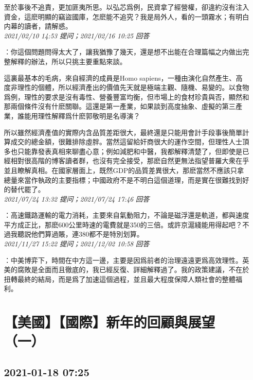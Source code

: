 \documentclass[twocolumn]{ctexart}
\begin{document}
至於事後不追責，更加匪夷所思。以弘芯爲例，民資拿了經營權，卻違約沒有注入資金，這麽明顯的竊盜國庫，怎麽能不追究？我是局外人，看的一頭霧水；有明白内幕的讀者，請解惑。
\\

\textit{\hfill\noindent\small 2021/02/10 14:53 提问；2021/02/16 10:25 回答}

：你這個問題問得太大了，讓我猶豫了幾天，還是想不出能在合理篇幅之内做出完整解釋的辦法，所以只挑主要重點來談。

這裏最基本的毛病，來自經濟的成員是Homo sapiens，一種由演化自然產生、高度非理性的個體，所以經濟產出的價值先天就是極端主觀、隨機、易變的。以食物爲例，理性的要求是沒有毒性、營養豐富均衡，但市場上的食材珍貴與否，顯然和那兩個條件沒有什麽關聯。這還是第一產業，如果談到高度抽象、虛擬的第三產業，誰能用理性解釋爲什麽郭敬明是名導演？

所以雖然經濟產值的實際内含品質差距很大，最終還是只能用會計手段事後簡單計算成交的總金額，很難排除虛胖。當然這留給奸商很大的運作空間，但理性人士頂多也只能靠發表真相來聊盡心意；例如減肥和中醫，我都解釋清楚了，但即使是已經相對很高階的博客讀者群，也沒有完全接受，那麽自然更無法指望普羅大衆在乎並且瞭解真相。在國家層面上，既然GDP的品質差異很大，那麽當然不應該只拿總量來當作執政的主要指標；中國政府不是不明白這個道理，而是實在很難找到好的替代罷了。
\\

\textit{\hfill\noindent\small 2021/07/24 13:32 提问；2021/07/24 17:46 回答}

：高速鐵路運輸的電力消耗，主要來自氣動阻力，不論是磁浮還是軌道，都與速度平方成正比，那麽600公里時速的電費就是350的三倍。或許京滬綫能用得起吧？不過我聽説他們算過賬，連380都不是特別划算。
\\

\textit{\hfill\noindent\small 2021/11/27 15:22 提问；2021/12/02 10:58 回答}

：中美博弈下，時間在中方這一邊，主要是因爲前者的治理遠遠更爲高效理性。英美的腐敗是全面而且徹底的，我已經反復、詳細解釋過了。我的政策建議，不在於扭轉最終的結局，而是爲了加速這個過程，並且最大程度保障人類社會的整體福利。
\\


\section{【美國】【國際】新年的回顧與展望（一）}
\subsection{2021-01-18 07:25}
\end{document}
